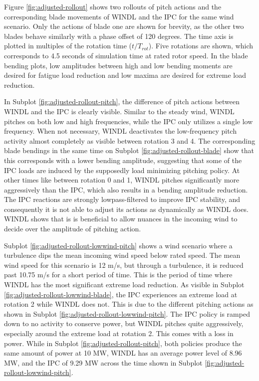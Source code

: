 Figure \ref{fig:adjusted-rollout} shows two rollouts of pitch actions and the corresponding blade movements of WINDL and the IPC for the same wind scenario. Only the actions of blade one are shown for brevity, as the other two blades behave similarly with a phase offset of 120 degrees. The time axis is plotted in multiples of the rotation time ($t/T_{rot}$). Five rotations are shown, which corresponds to 4.5 seconds of simulation time at rated rotor speed. In the blade bending plots, low amplitudes between high and low bending moments are desired for fatigue load reduction and low maxima are desired for extreme load reduction.

In Subplot \ref{fig:adjusted-rollout-pitch}, the difference of pitch actions between WINDL and the IPC is clearly visible. Similar to the steady wind, WINDL pitches on both low and high frequencies, while the IPC only utilizes a single low frequency. When not necessary, WINDL deactivates the low-frequency pitch activity almost completely as visible between rotation 3 and 4. The corresponding blade bendings in the same time on Subplot \ref{fig:adjusted-rollout-blade} show that this corresponds with a lower bending amplitude, suggesting that some of the IPC loads are induced by the supposedly load minimizing pitching policy. At other times like between rotation 0 and 1, WINDL pitches significantly more aggressively than the IPC, which also results in a bending amplitude reduction. The IPC reactions are strongly lowpass-filtered to improve IPC stability, and consequently it is not able to adjust its actions as dynamically as WINDL does. WINDL shows that is is beneficial to allow nuances in the incoming wind to decide over the amplitude of pitching action.

Subplot \ref{fig:adjusted-rollout-lowwind-pitch} shows a wind scenario where a turbulence dips the mean incoming wind speed below rated speed. The mean wind speed for this scenario is 12 m/s, but through a turbulence, it is reduced past 10.75 m/s for a short period of time. This is the period of time where WINDL has the most significant extreme load reduction. As visible in Subplot \ref{fig:adjusted-rollout-lowwind-blade}, the IPC experiences an extreme load at rotation 2 while WINDL does not. This is due to the different pitching actions as shown in Subplot \ref{fig:adjusted-rollout-lowwind-pitch}. The IPC policy is ramped down to no activity to conserve power, but WINDL pitches quite aggressively, especially around the extreme load at rotation 2. This comes with a loss in power. While in Subplot \ref{fig:adjusted-rollout-pitch}, both policies produce the same amount of power at 10 MW, WINDL has an average power level of 8.96 MW, and the IPC of 9.29 MW across the time shown in Subplot \ref{fig:adjusted-rollout-lowwind-pitch}. 

